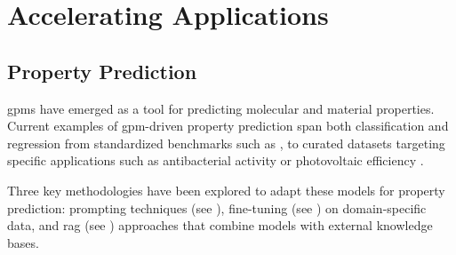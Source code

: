 \section{Accelerating Applications}
\subsection{Property Prediction} \label{sec:prediction}

\glspl{gpm} have emerged as a tool for predicting molecular and material properties. 
Current examples of \gls{gpm}-driven property prediction span both classification and regression from standardized benchmarks such as  \autocite{wu2018moleculenet}, to curated datasets targeting specific applications such as antibacterial activity \autocite{chithrananda2020chemberta} or photovoltaic efficiency \autocite{aneesh2025semantic}.

Three key methodologies have been explored to adapt these models for property prediction: prompting techniques (see ), fine-tuning (see ) on domain-specific data, and \gls{rag} (see ) approaches that combine models with external knowledge bases. 

